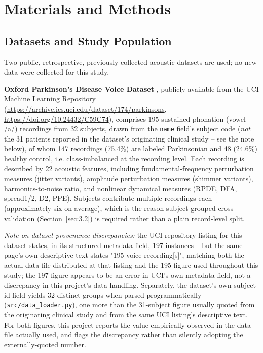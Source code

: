 \section{Materials and Methods}
\label{sec:3}

\subsection{Datasets and Study Population}
\label{sec:3.1}

Two public, retrospective, previously collected acoustic datasets are
used; no new data were collected for this study.

\textbf{Oxford Parkinson's Disease Voice Dataset} \cite{Little:2008},
publicly available from the UCI Machine Learning Repository
(\url{https://archive.ics.uci.edu/dataset/174/parkinsons},
\url{https://doi.org/10.24432/C59C74}), comprises 195 sustained phonation
(vowel /a/) recordings from 32 subjects, drawn from the \texttt{name}
field's subject code (\emph{not} the 31 patients reported in the
dataset's originating clinical study -- see the note below), of whom 147
recordings (75.4\%) are labeled
Parkinsonian and 48 (24.6\%) healthy control, i.e. class-imbalanced at the
recording level. Each recording is described by 22 acoustic features,
including fundamental-frequency perturbation measures (jitter variants),
amplitude perturbation measures (shimmer variants), harmonics-to-noise
ratio, and nonlinear dynamical measures (RPDE, DFA, spread1/2, D2, PPE).
Subjects contribute multiple recordings each (approximately six on
average), which is the reason subject-grouped cross-validation
(Section~\ref{sec:3.2}) is required rather than a plain
record-level split.

\emph{Note on dataset provenance discrepancies:} the UCI repository
listing for this dataset states, in its structured metadata field, 197
instances -- but the same page's own descriptive text states "195 voice
recording[s]", matching both the actual data file distributed at that
listing and the 195 figure used throughout this study; the 197 figure
appears to be an error in UCI's own metadata field, not a discrepancy in
this project's data handling. Separately, the dataset's own subject-id
field yields 32 distinct groups when parsed programmatically
(\texttt{src/data\_loader.py}), one more than the 31-subject figure
usually quoted from the originating clinical study and from the same UCI
listing's descriptive text. For both figures, this project reports the
value empirically observed in the data file actually used, and flags the
discrepancy rather than silently adopting the externally-quoted number.

